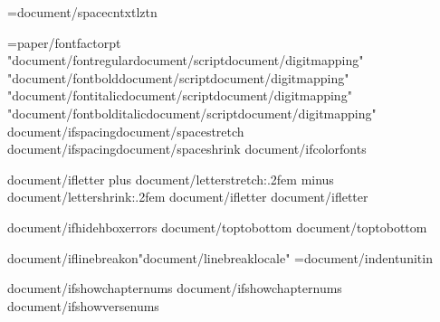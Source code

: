 \XeTeXinterwordspaceshaping={document/spacecntxtlztn}

={paper/fontfactor}pt
\def\regular{L_}{{"{document/fontregular}{document/script}{document/digitmapping}"}}
\def\bold{L_}{{"{document/fontbold}{document/script}{document/digitmapping}"}}
\def\italic{L_}{{"{document/fontitalic}{document/script}{document/digitmapping}"}}
\def\bolditalic{L_}{{"{document/fontbolditalic}{document/script}{document/digitmapping}"}}
{document/ifspacing}\def\SpaceStretchFactor{L_}{{{document/spacestretch}}}
{document/ifspacing}\def\SpaceShrinkFactor{L_}{{{document/spaceshrink}}}
{document/ifcolorfonts}\ColorFontsfalse


{document/ifletter}\newskip\intercharskip \intercharskip=0pt plus {document/letterstretch:.2f}em minus {document/lettershrink:.2f}em
{document/ifletter}\def\letterspace{{\nobreak\hskip\intercharskip}}
{document/ifletter}\DefineActiveChar{{^^^^fdd0}}{{\letterspace}}


{document/ifhidehboxerrors}\overfullrule=0pt
{document/toptobottom}     %
{document/toptobottom}\rotatetrue

{document/iflinebreakon}\XeTeXlinebreaklocale "{document/linebreaklocale}"
\IndentUnit={document/indentunit}in

{document/ifshowchapternums}\OmitChapterNumbertrue
{document/ifshowchapternums}\def\AfterChapterSpaceFactor{{10}}
{document/ifshowversenums}\def\AfterVerseSpaceFactor{{0}}

